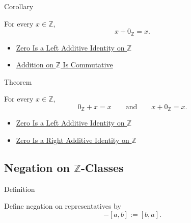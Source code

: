 \begin{corollarybox}{Corollary}
\begin{corollary}
\label{cor:zero-right-additive-identity-on-z}
For every $x\in\mathbb{Z}$,
\[
x+0_{\mathbb{Z}}=x.
\]
\end{corollary}
\end{corollarybox}

\begin{dependencies}
\begin{itemize}
  \item \hyperref[thm:zero-left-additive-identity-on-z]{Zero Is a Left Additive Identity on $\mathbb{Z}$}
  \item \hyperref[thm:addition-on-z-commutative]{Addition on $\mathbb{Z}$ Is Commutative}
\end{itemize}
\end{dependencies}

\begin{theorembox}{Theorem}
\begin{theorem}
\label{thm:zero-additive-identity-on-z}
For every $x\in\mathbb{Z}$,
\[
0_{\mathbb{Z}}+x=x
\qquad\text{and}\qquad
x+0_{\mathbb{Z}}=x.
\]
\end{theorem}
\end{theorembox}

\begin{dependencies}
\begin{itemize}
  \item \hyperref[thm:zero-left-additive-identity-on-z]{Zero Is a Left Additive Identity on $\mathbb{Z}$}
  \item \hyperref[cor:zero-right-additive-identity-on-z]{Zero Is a Right Additive Identity on $\mathbb{Z}$}
\end{itemize}
\end{dependencies}

\subsection*{Negation on $\mathbb{Z}$-Classes}

\begin{definitionbox}{Definition}
\begin{definition}
\label{def:negation-on-z-classes}
Define negation on representatives by
\[
-[a,b]:=[b,a].
\]
\end{definition}
\end{definitionbox}


